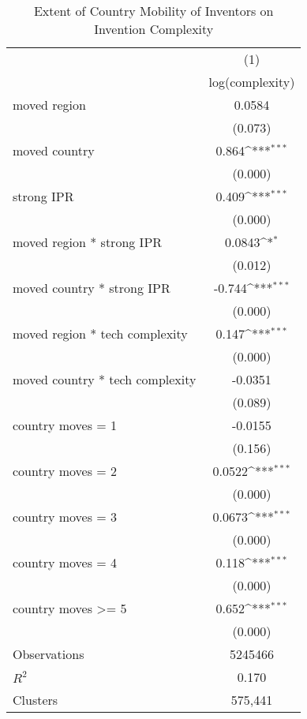 {
\def\sym#1{\ifmmode^{#1}\else\(^{#1}\)\fi}
\begin{longtable}{l*{1}{c}}
\caption{Extent of Country Mobility of Inventors on Invention Complexity \label{model5b}}\\
\hline\hline\endfirsthead\hline\endhead\hline\endfoot\endlastfoot
                &\multicolumn{1}{c}{(1)}\\
                &\multicolumn{1}{c}{log(complexity)}\\
\hline
moved region    &   0.0584         \\
                &  (0.073)         \\
moved country   &    0.864\sym{***}\\
                &  (0.000)         \\
strong IPR      &    0.409\sym{***}\\
                &  (0.000)         \\
moved region * strong IPR&   0.0843\sym{*}  \\
                &  (0.012)         \\
moved country * strong IPR&   -0.744\sym{***}\\
                &  (0.000)         \\
moved region * tech complexity&    0.147\sym{***}\\
                &  (0.000)         \\
moved country * tech complexity&  -0.0351         \\
                &  (0.089)         \\
country moves = 1&  -0.0155         \\
                &  (0.156)         \\
country moves = 2&   0.0522\sym{***}\\
                &  (0.000)         \\
country moves = 3&   0.0673\sym{***}\\
                &  (0.000)         \\
country moves = 4&    0.118\sym{***}\\
                &  (0.000)         \\
country moves >= 5&    0.652\sym{***}\\
                &  (0.000)         \\
\hline
Observations    &  5245466         \\
$R^2$              &    0.170         \\
Clusters         &  575,441         \\

\end{longtable}}
